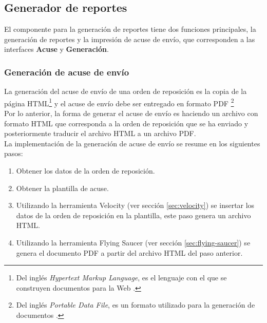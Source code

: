 \subsection{Generador de reportes}
El componente para la generación de reportes tiene dos funciones principales, la generación de reportes y la impresión de acuse de envío, que corresponden a las interfaces \textbf{Acuse} y \textbf{Generación}.

\subsubsection{Generación de acuse de envío}\label{sec:gen-acuse}
La generación del acuse de envío de una orden de reposición es la copia de la página HTML\footnote{Del inglés \textit{Hypertext Markup Language}, es el lenguaje con el que se construyen documentos para la Web \cite{HTMLCSSCompleteReference}.} y el acuse de envío debe ser entregado en formato PDF \footnote{Del inglés \textit{Portable Data File}, es un formato utilizado para la generación de documentos \cite{iTextInAction}.}\\
Por lo anterior, la forma de generar el acuse de envío es haciendo un archivo con formato HTML que corresponda a la orden de reposición que se ha enviado y posteriormente traducir el archivo HTML a un archivo PDF.\\
La implementación de la generación de acuse de envío se resume en los siguientes pasos:
\begin{enumerate}
	\item Obtener los datos de la orden de reposición.
	\item Obtener la plantilla de acuse.
	\item Utilizando la herramienta Velocity (ver sección \ref{sec:velocity}) se insertar los datos de la orden de reposición en la plantilla, este paso genera un archivo HTML.
	\item Utilizando la herramienta Flying Saucer (ver sección \ref{sec:flying-saucer}) se genera el documento PDF a partir del archivo HTML del paso anterior.
\end{enumerate}

